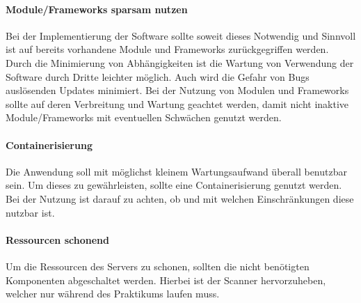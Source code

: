 \paragraph{Module/Frameworks sparsam nutzen}
Bei der Implementierung der Software sollte soweit dieses Notwendig und Sinnvoll ist auf bereits vorhandene Module und Frameworks zurückgegriffen werden. Durch die Minimierung von Abhängigkeiten ist die Wartung von Verwendung der Software durch Dritte leichter möglich. Auch wird die Gefahr von Bugs auslösenden Updates minimiert. Bei der Nutzung von Modulen und Frameworks sollte auf deren Verbreitung und Wartung geachtet werden, damit nicht inaktive Module/Frameworks mit eventuellen Schwächen genutzt werden.

\paragraph{Containerisierung}
Die Anwendung soll mit möglichst kleinem Wartungsaufwand überall benutzbar sein. Um dieses zu gewährleisten, sollte eine Containerisierung genutzt werden. Bei der Nutzung ist darauf zu achten, ob und mit welchen Einschränkungen diese nutzbar ist.

\paragraph{Ressourcen schonend}
Um die Ressourcen des Servers zu schonen, sollten die nicht benötigten Komponenten abgeschaltet werden. Hierbei ist der Scanner hervorzuheben, welcher nur während des Praktikums laufen muss. 